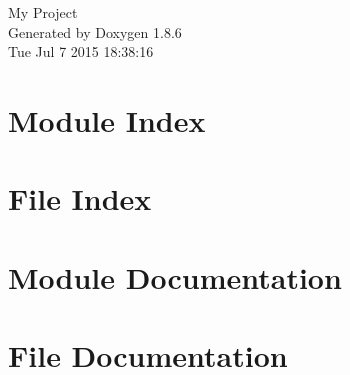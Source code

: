 \documentclass[twoside]{book}
\newcommand{\clearemptydoublepage}{%
  \newpage{\pagestyle{empty}\cleardoublepage}%
}
\begin{document}
\hypersetup{pageanchor=false}
\begin{titlepage}
\vspace*{7cm}
\begin{center}%
{\Large My Project }\\
\vspace*{1cm}
{\large Generated by Doxygen 1.8.6}\\
\vspace*{0.5cm}
{\small Tue Jul 7 2015 18:38:16}\\
\end{center}
\end{titlepage}
\clearemptydoublepage
\tableofcontents
\clearemptydoublepage
{}
\hypersetup{pageanchor=true}

\chapter{Module Index}

\chapter{File Index}

\chapter{Module Documentation}



























\chapter{File Documentation}




\newpage
{}
{}
\printindex
\end{document}
